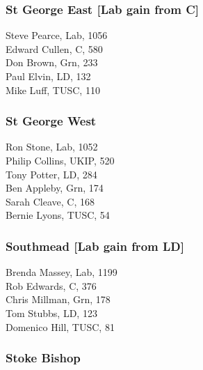 \documentclass[a4paper,openany,10pt]{book}
\begin{document}
\subsubsection*{St George East \hspace*{\fill}\nolinebreak[1]%
\enspace\hspace*{\fill}
[Lab gain from C]}



Steve Pearce, Lab, 1056\\
Edward Cullen, C, 580\\
Don Brown, Grn, 233\\
Paul Elvin, LD, 132\\
Mike Luff, TUSC, 110\\


\subsubsection*{St George West}



Ron Stone, Lab, 1052\\
Philip Collins, UKIP, 520\\
Tony Potter, LD, 284\\
Ben Appleby, Grn, 174\\
Sarah Cleave, C, 168\\
Bernie Lyons, TUSC, 54\\


\subsubsection*{Southmead \hspace*{\fill}\nolinebreak[1]%
\enspace\hspace*{\fill}
[Lab gain from LD]}



Brenda Massey, Lab, 1199\\
Rob Edwards, C, 376\\
Chris Millman, Grn, 178\\
Tom Stubbs, LD, 123\\
Domenico Hill, TUSC, 81\\


\subsubsection*{Stoke Bishop}
\end{document}
